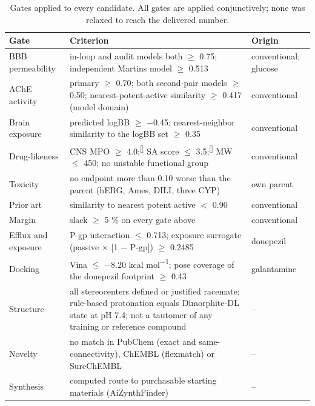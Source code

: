 \documentclass[11pt,a4paper]{article}
\renewcommand{\cite}[1]{\textsuperscript{[\citenum{#1}]}}
\begin{document}
\begin{table}[htb]
\centering\small
\caption{Gates applied to every candidate. All gates are applied conjunctively; none was relaxed to reach the delivered number.}
\label{tab:1}
\renewcommand{\arraystretch}{1.2}
\begin{tabular}{@{}>{\raggedright\arraybackslash}p{}>{\raggedright\arraybackslash}p{}>{\centering\arraybackslash}p{}@{}}
\toprule
\textbf{Gate} & \textbf{Criterion} & \textbf{Origin} \\
\midrule
BBB permeability & in-loop and audit models both $\geq$ 0.75; independent Martins model $\geq$ 0.513 & conventional; glucose \\
AChE activity & primary $\geq$ 0.70; both second-pair models $\geq$ 0.50; nearest-potent-active similarity $\geq$ 0.417 (model domain) & conventional \\
Brain exposure & predicted logBB $\geq$ $-$0.45; nearest-neighbor similarity to the logBB set $\geq$ 0.35 & conventional \\
Drug-likeness & CNS MPO $\geq$ 4.0;\cite{wager10,wager16} SA score $\leq$ 3.5;\cite{ertl} MW $\leq$ 450; no unstable functional group & conventional \\
Toxicity & no endpoint more than 0.10 worse than the parent (hERG, Ames, DILI, three CYP) & own parent \\
Prior art & similarity to nearest potent active $<$ 0.90 & conventional \\
Margin & slack $\geq$ 5 \% on every gate above & conventional \\
Efflux and exposure & P-gp interaction $\leq$ 0.713; exposure surrogate (passive $\times$ [1 $-$ P-gp]) $\geq$ 0.2485 & donepezil \\
Docking & Vina $\leq$ $-$8.20 kcal mol\textsuperscript{$-$1}; pose coverage of the donepezil footprint $\geq$ 0.43 & galantamine \\
Structure & all stereocenters defined or justified racemate; rule-based protonation equals Dimorphite-DL state at pH 7.4; not a tautomer of any training or reference compound & -- \\
Novelty & no match in PubChem (exact and same-connectivity), ChEMBL (flexmatch) or SureChEMBL & -- \\
Synthesis & computed route to purchasable starting materials (AiZynthFinder) & -- \\
\bottomrule
\end{tabular}
\end{table}
\end{document}
